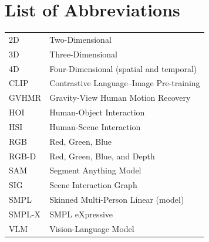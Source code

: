 \chapter*{List of Abbreviations}

\begin{tabularx}{\textwidth}{@{}lX@{}}
\toprule
2D      & Two-Dimensional \\
3D      & Three-Dimensional \\
4D      & Four-Dimensional (spatial and temporal) \\
CLIP    & Contrastive Language--Image Pre-training \\
GVHMR   & Gravity-View Human Motion Recovery \\
HOI     & Human-Object Interaction \\
HSI     & Human-Scene Interaction \\
RGB     & Red, Green, Blue \\
RGB-D   & Red, Green, Blue, and Depth \\
SAM     & Segment Anything Model \\
SIG     & Scene Interaction Graph \\
SMPL    & Skinned Multi-Person Linear (model) \\
SMPL-X  & SMPL eXpressive \\
VLM     & Vision-Language Model \\
\bottomrule
\end{tabularx}

\cleardoublepage
